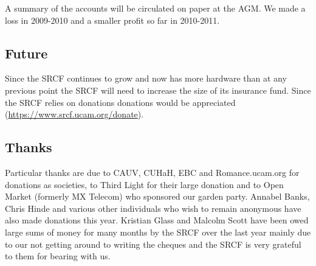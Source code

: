 A summary of the accounts will be circulated on paper at the AGM. We made a loss in 2009-2010 and a smaller profit so far in 2010-2011.

\subsection{Future}
Since the SRCF continues to grow and now has more hardware than at any previous point the SRCF will need to increase the size of its insurance fund. Since the SRCF relies on donations donations would be appreciated (\url{https://www.srcf.ucam.org/donate}).
\subsection{Thanks}
Particular thanks are due to CAUV, CUHaH, EBC and Romance.ucam.org for donations as societies, to Third Light for their large donation and to Open Market (formerly MX Telecom) who sponsored our garden party. Annabel Banks, Chris Hinde and various other individuals who wish to remain anonymous have also made donations this year. Kristian Glass and Malcolm Scott have been owed large sums of money for many months by the SRCF over the last year mainly due to our not getting around to writing the cheques and the SRCF is very grateful to them for bearing with us.
